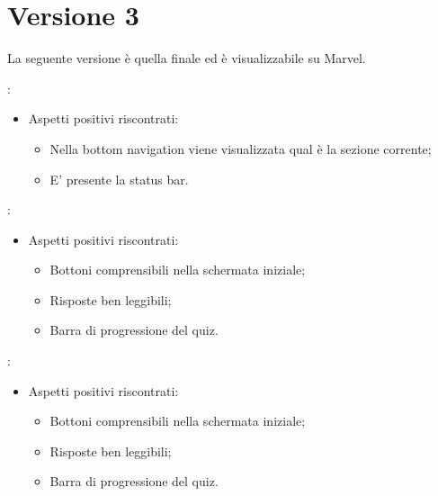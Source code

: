 \documentclass{article}
\begin{document}
\section{Versione 3}
La seguente versione è quella finale ed è visualizzabile su Marvel.
\begin{description}
\addtolength{\itemindent}{0.5cm}
\item [Generale] :
	\begin{itemize}
	\item Aspetti positivi riscontrati:
		\begin{itemize}
		\item Nella bottom navigation viene visualizzata qual è la sezione corrente;
		\item E' presente la status bar.
	\end{itemize}
	\end{itemize}
	
\item [Quiz Giornaliero] :
\begin{itemize}
	\item Aspetti positivi riscontrati:
		\begin{itemize}
        \item Bottoni comprensibili nella schermata iniziale;
        \item Risposte ben leggibili;
        \item Barra di progressione del quiz.
        \end{itemize}
	\end{itemize}
\item [Quiz Settimanale]:
	\begin{itemize}
	\item Aspetti positivi riscontrati:
	\begin{itemize}
		\item Bottoni comprensibili nella schermata iniziale;
        \item Risposte ben leggibili;
        \item Barra di progressione del quiz.
	\end{itemize}
\end{itemize}


\end{description}
\end{document}
